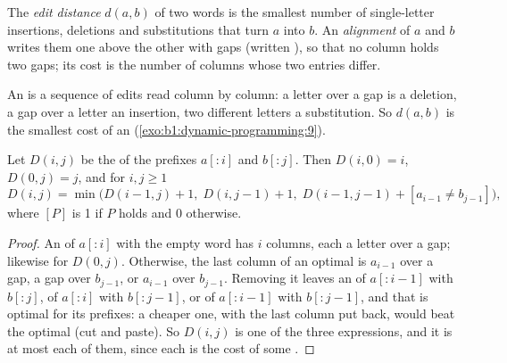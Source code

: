 \begin{definition}\label{def:b1:dynamic-programming:edit}
The \emph{edit distance} $d(a, b)$ of two words is the smallest number of single-letter
insertions, deletions and substitutions that turn $a$ into $b$. An \emph{alignment} of $a$ and $b$
writes them one above the other with gaps (written \code{-}), so that no column holds two gaps; its cost is the number
of columns whose two entries differ.
\end{definition}

An  is a sequence of edits read column by column: a letter over a gap is a deletion, a gap over a letter an
insertion, two different letters a substitution. So $d(a, b)$ is the smallest cost of an 
(\cref{exo:b1:dynamic-programming:9}).

\begin{proposition}\label{prop:b1:dynamic-programming:edit}
Let $D(i, j)$ be the  of the prefixes $a[{:}i]$ and $b[{:}j]$. Then $D(i, 0) = i$, $D(0, j) = j$, and for
$i, j \geq 1$
\[ D(i, j) = \min\bigl(D(i - 1, j) + 1,\; D(i, j - 1) + 1,\; D(i - 1, j - 1) + [a_{i-1} \neq b_{j-1}]\bigr), \]
where $[P]$ is 1 if $P$ holds and 0 otherwise.
\end{proposition}

\begin{proof}
An  of $a[{:}i]$ with the empty word has $i$ columns, each a letter over a gap; likewise for $D(0, j)$.
Otherwise, the last column of an optimal  is $a_{i-1}$ over a gap, a gap over $b_{j-1}$, or $a_{i-1}$ over
$b_{j-1}$. Removing it leaves an  of $a[{:}i - 1]$ with $b[{:}j]$, of $a[{:}i]$ with $b[{:}j - 1]$, or of $a[{:}i
- 1]$ with $b[{:}j - 1]$, and that  is optimal for its prefixes: a cheaper one, with the last column put back,
would beat the optimal  (cut and paste). So $D(i, j)$ is one of the three expressions, and it is at most each
of them, since each is the cost of some .
\end{proof}

\label{lst:b1:dynamic-programming:edit}

